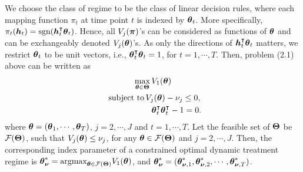 We choose the class of regime to be the class of linear decision rules, where each mapping function $\pi_t$ at time point $t$ is indexed by $\boldsymbol{\theta}_t$. More specifically, $\pi_t(\boldsymbol{h}_t) = \text{sgn}(\boldsymbol{h}^{\intercal}_t\boldsymbol{\theta}_t)$. Hence, all $V_j(\boldsymbol{\pi})$'s can be considered as functions of $\boldsymbol{\theta}$ and can be exchangeably denoted $V_j(\boldsymbol{\theta})$'s. As only the directions of $\boldsymbol{h}^\intercal_t\boldsymbol{\theta}_t$ matters, we restrict $\boldsymbol{\theta}_t$ to be unit vectors, i.e., $\boldsymbol{\theta}^\intercal_t\boldsymbol{\theta}_t = 1$, for $t = 1, \cdots, T$. Then, problem (2.1) above can be written as
\begin{equation}
\begin{gathered}
\max_{\boldsymbol{\theta} \in \boldsymbol{\Theta}} V_1(\boldsymbol{\theta})\\
\,\, \text{subject to}\,
V_j(\boldsymbol{\theta}) - \nu_j \le 0,\\
\hspace{2.0cm} \boldsymbol{\theta}_t^\intercal \boldsymbol{\theta}_t^\intercal - 1 =0.
\end{gathered}
 \end{equation}
where $\boldsymbol{\theta} = (\boldsymbol{\theta}_1, \cdots, \boldsymbol{\theta}_T)$, $j =2, \cdots, J$ and $t = 1, \cdots, T$. Let the feasible set of $\boldsymbol{\Theta}$ be $\mathcal{F}(\boldsymbol{\Theta})$, such that $V_j(\boldsymbol{\theta}) \le \nu_j$,  for any $\boldsymbol{\theta} \in \mathcal{F}(\boldsymbol{\Theta})$ and $j = 2, \cdots, J$. Then, the corresponding index parameter of a constrained optimal dynamic treatment regime is $\boldsymbol{\theta}^*_{\boldsymbol{\nu}} =\text{argmax}_{\boldsymbol{\theta} \in \mathcal{F}(\boldsymbol{\Theta})}V_1(\boldsymbol{\theta})$, and $\boldsymbol{\theta}^*_{\boldsymbol{\nu}} = (\boldsymbol{\theta}^*_{\boldsymbol{\nu},1}, \boldsymbol{\theta}^*_{\boldsymbol{\nu},2}, \cdots, \boldsymbol{\theta}^*_{\boldsymbol{\nu},T})$.

